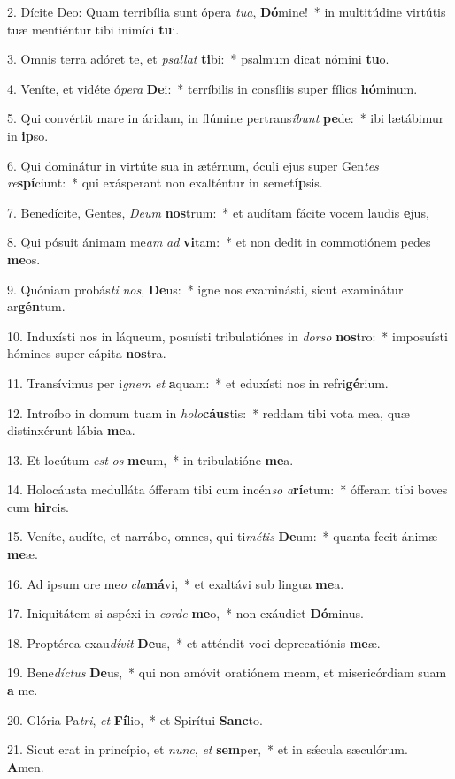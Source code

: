 2. Dícite Deo: Quam terribília sunt ópera \textit{tu}\textit{a}, \textbf{Dó}mine!~*  in multitúdine virtútis tuæ mentiéntur tibi inimíci \textbf{tu}i.\

3. Omnis terra adóret te, et \textit{psal}\textit{lat} \textbf{ti}bi:~*  psalmum dicat nómini \textbf{tu}o.\

4. Veníte, et vidéte ó\textit{pe}\textit{ra} \textbf{De}i:~*  terríbilis in consíliis super fílios \textbf{hó}minum.\

5. Qui convértit mare in áridam, in flúmine pertrans\textit{í}\textit{bunt} \textbf{pe}de:~*  ibi lætábimur in \textbf{ip}so.\

6. Qui dominátur in virtúte sua in ætérnum, óculi ejus super Gen\textit{tes} \textit{re}\textbf{spí}ciunt:~*  qui exásperant non exalténtur in semet\textbf{íp}sis.\

7. Benedícite, Gentes, \textit{De}\textit{um} \textbf{nos}trum:~*  et audítam fácite vocem laudis \textbf{e}jus,\

8. Qui pósuit ánimam me\textit{am} \textit{ad} \textbf{vi}tam:~*  et non dedit in commotiónem pedes \textbf{me}os.\

9. Quóniam probás\textit{ti} \textit{nos}, \textbf{De}us:~*  igne nos examinásti, sicut examinátur ar\textbf{gén}tum.\

10. Induxísti nos in láqueum, posuísti tribulatiónes in \textit{dor}\textit{so} \textbf{nos}tro:~*  imposuísti hómines super cápita \textbf{nos}tra.\

11. Transívimus per i\textit{gnem} \textit{et} \textbf{a}quam:~*  et eduxísti nos in refri\textbf{gé}rium.\

12. Introíbo in domum tuam in \textit{ho}\textit{lo}\textbf{cáus}tis:~*  reddam tibi vota mea, quæ distinxérunt lábia \textbf{me}a.\

13. Et locútum \textit{est} \textit{os} \textbf{me}um,~*  in tribulatióne \textbf{me}a.\

14. Holocáusta medulláta ófferam tibi cum incén\textit{so} \textit{a}\textbf{rí}etum:~*  ófferam tibi boves cum \textbf{hir}cis.\

15. Veníte, audíte, et narrábo, omnes, qui ti\textit{mé}\textit{tis} \textbf{De}um:~*  quanta fecit ánimæ \textbf{me}æ.\

16. Ad ipsum ore me\textit{o} \textit{cla}\textbf{má}vi,~*  et exaltávi sub lingua \textbf{me}a.\

17. Iniquitátem si aspéxi in \textit{cor}\textit{de} \textbf{me}o,~*  non exáudiet \textbf{Dó}minus.\

18. Proptérea exau\textit{dí}\textit{vit} \textbf{De}us,~*  et atténdit voci deprecatiónis \textbf{me}æ.\

19. Bene\textit{díc}\textit{tus} \textbf{De}us,~*  qui non amóvit oratiónem meam, et misericórdiam suam \textbf{a} me.\

20. Glória Pa\textit{tri}, \textit{et} \textbf{Fí}lio,~*  et Spirítui \textbf{Sanc}to.\

21. Sicut erat in princípio, et \textit{nunc}, \textit{et} \textbf{sem}per,~*  et in sǽcula sæculórum. \textbf{A}men.\

